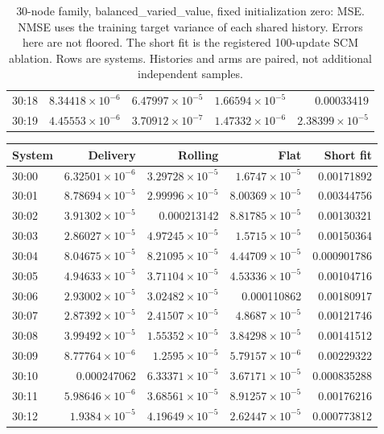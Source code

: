 \begin{table}[ht]
\begin{tabular}{lrrrr}
30:18 & $8.34418\times10^{-6}$ & $6.47997\times10^{-5}$ & $1.66594\times10^{-5}$ & 0.00033419\\
30:19 & $4.45553\times10^{-6}$ & $3.70912\times10^{-7}$ & $1.47332\times10^{-6}$ & $2.38399\times10^{-5}$\\
\bottomrule
\end{tabular}
\caption{30-node family, balanced\_varied\_value, fixed initialization zero: MSE. NMSE uses the training target variance of each shared history. Errors here are not floored. The short fit is the registered 100-update SCM ablation. Rows are systems. Histories and arms are paired, not additional independent samples.}
\end{table}
\begin{table}[ht]
\centering\scriptsize
\begin{tabular}{lrrrr}
\toprule
System & Delivery & Rolling & Flat & Short fit\\
\midrule
30:00 & $6.32501\times10^{-6}$ & $3.29728\times10^{-5}$ & $1.6747\times10^{-5}$ & 0.00171892\\
30:01 & $8.78694\times10^{-5}$ & $2.99996\times10^{-5}$ & $8.00369\times10^{-5}$ & 0.00344756\\
30:02 & $3.91302\times10^{-5}$ & 0.000213142 & $8.81785\times10^{-5}$ & 0.00130321\\
30:03 & $2.86027\times10^{-5}$ & $4.97245\times10^{-5}$ & $1.5715\times10^{-5}$ & 0.00150364\\
30:04 & $8.04675\times10^{-5}$ & $8.21095\times10^{-5}$ & $4.44709\times10^{-5}$ & 0.000901786\\
30:05 & $4.94633\times10^{-5}$ & $3.71104\times10^{-5}$ & $4.53336\times10^{-5}$ & 0.00104716\\
30:06 & $2.93002\times10^{-5}$ & $3.02482\times10^{-5}$ & 0.000110862 & 0.00180917\\
30:07 & $2.87392\times10^{-5}$ & $2.41507\times10^{-5}$ & $4.8687\times10^{-5}$ & 0.00121746\\
30:08 & $3.99492\times10^{-5}$ & $1.55352\times10^{-5}$ & $3.84298\times10^{-5}$ & 0.00141512\\
30:09 & $8.77764\times10^{-6}$ & $1.2595\times10^{-5}$ & $5.79157\times10^{-6}$ & 0.00229322\\
30:10 & 0.000247062 & $6.33371\times10^{-5}$ & $3.67171\times10^{-5}$ & 0.000835288\\
30:11 & $5.98646\times10^{-6}$ & $3.68561\times10^{-5}$ & $8.91257\times10^{-5}$ & 0.00176216\\
30:12 & $1.9384\times10^{-5}$ & $4.19649\times10^{-5}$ & $2.62447\times10^{-5}$ & 0.000773812\\

\end{tabular}
\end{table}

